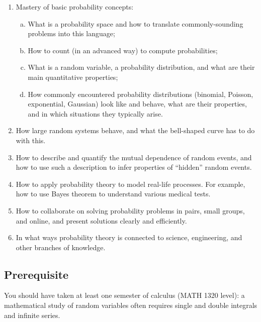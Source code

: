 \documentclass[oneside,11pt]{amsart}
\begin{document}
\begin{enumerate}[\bf{}1.]
	\item Mastery of basic probability concepts:
	\begin{enumerate}[(a)]
		\item What is a probability space and how to translate commonly-sounding problems into this language;
		\item How to count (in an advanced way) to compute probabilities;
		\item What is a random variable, a probability distribution,
		and what are their main quantitative properties;
		\item 
		How commonly encountered probability 
		distributions (binomial, Poisson, exponential, Gaussian) look like and behave,
		what are 
		their properties, and in which situations they typically arise.
	\end{enumerate}

	\item How large random systems behave, and what the 
	bell-shaped curve
	has to do with this.
	\item How to describe and quantify the mutual dependence of random events,
	and how to use such a description 
	to infer properties of ``hidden'' random events.
	\item How to apply probability theory to model real-life processes. For example,
		how to use Bayes theorem to understand various medical tests.
	\item How to collaborate on solving probability problems in pairs, small groups, and online,
	and present solutions clearly and efficiently.
	\item In what ways probability theory is connected to science, engineering, and other branches of knowledge.
\end{enumerate}

\subsection*{Prerequisite} You should have taken at least one semester of calculus (MATH 1320 level): a mathematical study of random variables often requires single and double integrals and infinite series.
\end{document}
